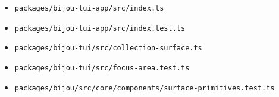 \begin{itemize}
\item
  \texttt{p\allowbreak{}a\allowbreak{}c\allowbreak{}k\allowbreak{}a\allowbreak{}g\allowbreak{}e\allowbreak{}s\allowbreak{}/\allowbreak{}b\allowbreak{}i\allowbreak{}j\allowbreak{}o\allowbreak{}u\allowbreak{}-\allowbreak{}t\allowbreak{}u\allowbreak{}i\allowbreak{}-\allowbreak{}a\allowbreak{}p\allowbreak{}p\allowbreak{}/\allowbreak{}s\allowbreak{}r\allowbreak{}c\allowbreak{}/\allowbreak{}i\allowbreak{}n\allowbreak{}d\allowbreak{}e\allowbreak{}x\allowbreak{}.\allowbreak{}t\allowbreak{}s}
\item
  \texttt{p\allowbreak{}a\allowbreak{}c\allowbreak{}k\allowbreak{}a\allowbreak{}g\allowbreak{}e\allowbreak{}s\allowbreak{}/\allowbreak{}b\allowbreak{}i\allowbreak{}j\allowbreak{}o\allowbreak{}u\allowbreak{}-\allowbreak{}t\allowbreak{}u\allowbreak{}i\allowbreak{}-\allowbreak{}a\allowbreak{}p\allowbreak{}p\allowbreak{}/\allowbreak{}s\allowbreak{}r\allowbreak{}c\allowbreak{}/\allowbreak{}i\allowbreak{}n\allowbreak{}d\allowbreak{}e\allowbreak{}x\allowbreak{}.\allowbreak{}t\allowbreak{}e\allowbreak{}s\allowbreak{}t\allowbreak{}.\allowbreak{}t\allowbreak{}s}
\item
  \texttt{p\allowbreak{}a\allowbreak{}c\allowbreak{}k\allowbreak{}a\allowbreak{}g\allowbreak{}e\allowbreak{}s\allowbreak{}/\allowbreak{}b\allowbreak{}i\allowbreak{}j\allowbreak{}o\allowbreak{}u\allowbreak{}-\allowbreak{}t\allowbreak{}u\allowbreak{}i\allowbreak{}/\allowbreak{}s\allowbreak{}r\allowbreak{}c\allowbreak{}/\allowbreak{}c\allowbreak{}o\allowbreak{}l\allowbreak{}l\allowbreak{}e\allowbreak{}c\allowbreak{}t\allowbreak{}i\allowbreak{}o\allowbreak{}n\allowbreak{}-\allowbreak{}s\allowbreak{}u\allowbreak{}r\allowbreak{}f\allowbreak{}a\allowbreak{}c\allowbreak{}e\allowbreak{}.\allowbreak{}t\allowbreak{}s}
\item
  \texttt{p\allowbreak{}a\allowbreak{}c\allowbreak{}k\allowbreak{}a\allowbreak{}g\allowbreak{}e\allowbreak{}s\allowbreak{}/\allowbreak{}b\allowbreak{}i\allowbreak{}j\allowbreak{}o\allowbreak{}u\allowbreak{}-\allowbreak{}t\allowbreak{}u\allowbreak{}i\allowbreak{}/\allowbreak{}s\allowbreak{}r\allowbreak{}c\allowbreak{}/\allowbreak{}f\allowbreak{}o\allowbreak{}c\allowbreak{}u\allowbreak{}s\allowbreak{}-\allowbreak{}a\allowbreak{}r\allowbreak{}e\allowbreak{}a\allowbreak{}.\allowbreak{}t\allowbreak{}e\allowbreak{}s\allowbreak{}t\allowbreak{}.\allowbreak{}t\allowbreak{}s}
\item
  \texttt{p\allowbreak{}a\allowbreak{}c\allowbreak{}k\allowbreak{}a\allowbreak{}g\allowbreak{}e\allowbreak{}s\allowbreak{}/\allowbreak{}b\allowbreak{}i\allowbreak{}j\allowbreak{}o\allowbreak{}u\allowbreak{}/\allowbreak{}s\allowbreak{}r\allowbreak{}c\allowbreak{}/\allowbreak{}c\allowbreak{}o\allowbreak{}r\allowbreak{}e\allowbreak{}/\allowbreak{}c\allowbreak{}o\allowbreak{}m\allowbreak{}p\allowbreak{}o\allowbreak{}n\allowbreak{}e\allowbreak{}n\allowbreak{}t\allowbreak{}s\allowbreak{}/\allowbreak{}s\allowbreak{}u\allowbreak{}r\allowbreak{}f\allowbreak{}a\allowbreak{}c\allowbreak{}e\allowbreak{}-\allowbreak{}p\allowbreak{}r\allowbreak{}i\allowbreak{}m\allowbreak{}i\allowbreak{}t\allowbreak{}i\allowbreak{}v\allowbreak{}e\allowbreak{}s\allowbreak{}.\allowbreak{}t\allowbreak{}e\allowbreak{}s\allowbreak{}t\allowbreak{}.\allowbreak{}t\allowbreak{}s}

\end{itemize}
